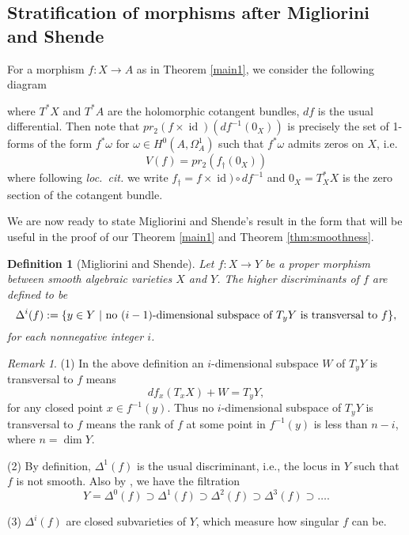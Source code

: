 \documentclass[a4paper,12pt,reqno]{amsart}
\theoremstyle{plain}
\newtheorem{definition}[theorem]{Definition}
\theoremstyle{remark}
\newtheorem{remark}[theorem]{Remark}
\newcommand{\id}{\operatorname{id}}
\newcommand{\pr}{\operatorname{pr}}
\begin{document}
\subsection{Stratification of morphisms after Migliorini and Shende}

For a morphism $f: X\to A$ as in Theorem \ref{main1},  we consider the following diagram 
\begin{center}
\end{center}
 where $T^*X$ and $T^*A$ are the holomorphic cotangent bundles, 
$df$ is the usual differential. Then note
that $pr_2(f\times \id)(df^{-1}(0_X))$ is precisely the 
set of 1-forms of the form $f^*\omega$ for $\omega\in H^0(A, \Omega_A^1)$ such that $f^*\omega$ admits zeros on $X$,
i.e.\
\[V(f) = pr_2(f_{\dagger}(0_X))\]
where following \emph{loc.\ cit.} we write $f_{\dagger} = f\times \id)\circ df^{-1}$ and $0_X = T_X^*X$ is the zero section
of the cotangent bundle. 

We are now ready to state Migliorini and Shende's
result \cite{MiSh} in the form that will be useful in the proof of our Theorem \ref{main1} and Theorem \ref{thm:smoothness}.

\begin{definition}[Migliorini and Shende]\label{def:higherdiscriminants}
Let $f: X\to Y$ be a proper morphism between smooth algebraic  varieties $X$ and $Y$. The higher discriminants of $f $ are defined to be
$$\Delta^i(f):=\{ y\in Y\ |\ \textnormal{no}\ (i-1)\textnormal{-dimensional subspace of}\  T_yY \ \textnormal{is transversal to} \ f \},$$ for each nonnegative integer $i$.
\end{definition}

\begin{remark}
(1) In the above definition an $i$-dimensional subspace $W$ of $T_yY$ is transversal to $f$ means $$df_x(T_xX)+W=T_yY,$$ for any closed point $x\in f^{-1}(y)$. Thus no $i$-dimensional subspace of $T_yY$ is transversal to $f$ means the rank of $f$ at some point in $f^{-1}(y)$ is less than $n-i$, where $n=\dim Y$.

(2) By definition, $\Delta^1(f)$ is the usual discriminant, i.e., the locus in $Y$ such that $f$ is not smooth. Also by \cite[Proposition 10.6]{Har77}, we have the filtration  $$Y=\Delta^0(f)\supset \Delta^1(f)\supset\Delta^2(f)\supset\Delta^3(f)\supset\ldots.$$

(3) $\Delta^i(f)$ are closed subvarieties of $Y$, which measure how singular $f$ can be.
\end{remark}
\end{document}
